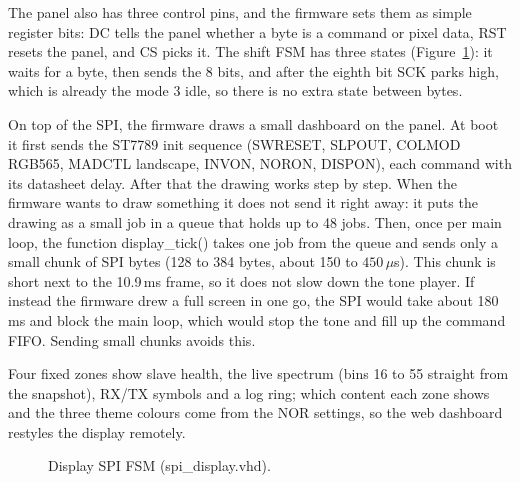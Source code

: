 \documentclass[a4paper,10pt]{article}
\begin{document}
The panel also has three control pins, and the firmware sets them as simple register bits:
DC tells the panel whether a byte is a command or pixel data, RST resets the panel, and CS
picks it. The shift FSM has three states (Figure~\ref{fig:disp-fsm}): it waits for a byte,
then sends the 8 bits, and after the eighth bit SCK parks high, which is already the mode 3
idle, so there is no extra state between bytes.

On top of the SPI, the firmware draws a small dashboard on the panel. At boot it first
sends the ST7789 init sequence (SWRESET, SLPOUT, COLMOD RGB565, MADCTL landscape, INVON,
NORON, DISPON), each command with its datasheet delay. After that the drawing works step by
step. When the firmware wants to draw something it does not send it right away: it puts the
drawing as a small job in a queue that holds up to 48 jobs. Then, once per main loop, the
function display\_tick() takes one job from the queue and sends only a small chunk
of SPI bytes (128 to 384 bytes, about 150 to $450\,\mu$s). This chunk is short next to the
10.9\,ms frame, so it does not slow down the tone player. If instead the firmware drew a
full screen in one go, the SPI would take about 180\,ms and block the main loop, which would
stop the tone and fill up the command FIFO. Sending small chunks avoids this.

Four fixed zones show slave health, the live spectrum
(bins 16 to 55 straight from the snapshot), RX/TX symbols and a log ring; which
content each zone shows and the three theme colours come from the NOR settings, so
the web dashboard restyles the display remotely.

\begin{figure}[H]
\centering
{}
\caption{Display SPI FSM (spi\_display.vhd).}
\label{fig:disp-fsm}
\end{figure}
\end{document}
